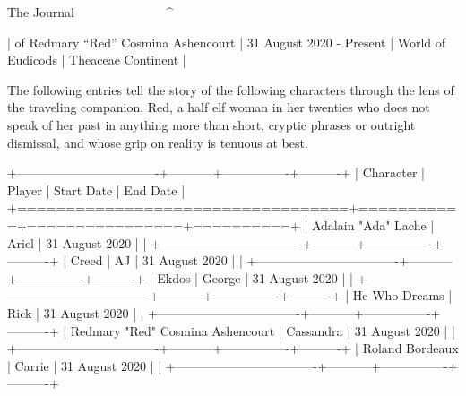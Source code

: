 The Journal
^^^^^^^^^^^^^^^^^^^^^^^^^^^^^^^^^^^^^^^^^^^^^^^^^^^^^^^^^^^^^^^^^^^^^^^^^^^^

| of Redmary “Red” Cosmina Ashencourt
| 31 August 2020 - Present
| World of Eudicods
| Theaceae Continent
|

The following entries tell the story of the following characters through the lens of the traveling companion, Red, a half elf woman in her twenties who does not speak of her past in anything more than short, cryptic phrases or outright dismissal, and whose grip on reality is tenuous at best.

+----------------------------------+-----------+----------------+----------+
| Character                        | Player    | Start Date     | End Date |
+==================================+===========+================+==========+
| Adalain "Ada" Lache              | Ariel     | 31 August 2020 |          |
+----------------------------------+-----------+----------------+----------+
| Creed                            | AJ        | 31 August 2020 |          |
+----------------------------------+-----------+----------------+----------+
| Ekdos                            | George    | 31 August 2020 |          |
+----------------------------------+-----------+----------------+----------+
| He Who Dreams                    | Rick      | 31 August 2020 |          |
+----------------------------------+-----------+----------------+----------+
| Redmary "Red" Cosmina Ashencourt | Cassandra | 31 August 2020 |          |
+----------------------------------+-----------+----------------+----------+
| Roland Bordeaux                  | Carrie    | 31 August 2020 |          |
+----------------------------------+-----------+----------------+----------+
